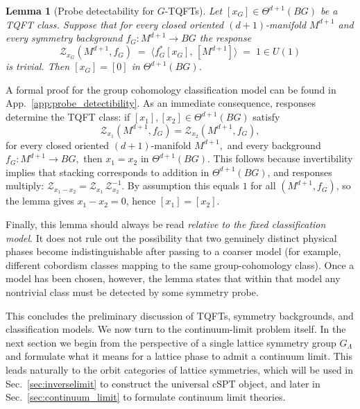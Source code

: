 \documentclass[aps,prx,reprint,superscriptaddress,twocolumn,amsmath,amssymb,amsfonts, nofootinbib]{revtex4-2}
\theoremstyle{apsstyle}
\newtheorem{lemma}{Lemma}
\begin{document}
\bigskip 

\begin{lemma}[Probe detectability for $G$-TQFTs]
\label{lemma:probe}
Let  $[x_{G}]\in \Theta^{d+1}(BG)$ be a TQFT class. Suppose that for every closed oriented $(d{+}1)$-manifold $M^{d+1}$ and every symmetry background
$f_{G}:M^{d+1}\to BG$ the response
\begin{equation*}
  \mathcal Z_{x_{G}}(M^{d+1},f_G)
  \;=\;
  \big\langle f_G^{*}[x_{G}],\,[M^{d+1}]\big\rangle
  \;=\; 1 \in U(1)
\end{equation*}
is trivial. Then $[x_{G}] = [0]$ in $\Theta^{d+1}(BG)$.
\end{lemma}

\bigskip

A formal proof for the group cohomology classification model can be found in App.~\ref{app:probe_detectibility}. As an immediate consequence, responses determine the TQFT class: if $[x_1],[x_2]\in \Theta^{d+1}(BG)$ satisfy
\begin{equation*}
  \mathcal Z_{x_1}(M^{d+1},f_G)=\mathcal Z_{x_2}(M^{d+1},f_G),
\end{equation*}
for every closed oriented $(d{+}1)$-manifold $M^{d+1},$ and every background $f_G:M^{d+1}\to BG,$ then $x_1=x_2$ in $\Theta^{d+1}(BG)$. This follows because invertibility implies that stacking corresponds to addition in $\Theta^{d+1}(BG)$, and responses multiply: $\mathcal Z_{x_1-x_2}=\mathcal Z_{x_1}\,\mathcal Z_{x_2}^{-1}$. By assumption this equals $1$ for all $(M^{d+1},f_G)$, so the lemma gives $x_1-x_2=0$, hence $[x_1]=[x_2]$. 

\medskip


Finally, this lemma should always be read \emph{relative to the fixed classification model}. It does not rule out the possibility that two genuinely distinct physical phases become indistinguishable after passing to a coarser model (for example, different cobordism classes mapping to the same group-cohomology class). Once a model has been chosen, however, the lemma states that within that model any nontrivial class must be detected by some symmetry probe.

\bigskip 

This concludes the preliminary discussion of TQFTs, symmetry backgrounds, and classification models. We now turn to the continuum-limit problem itself. In the next section we begin from the perspective of a single lattice symmetry group $G_{\Lambda}$ and formulate what it means for a lattice phase to admit a continuum limit. This leads naturally to the orbit categories of lattice symmetries, which will be used in Sec.~\ref{sec:inverselimit} to construct the universal cSPT object, and later in Sec.~\ref{sec:continuum_limit} to formulate continuum limit theories.
\end{document}
